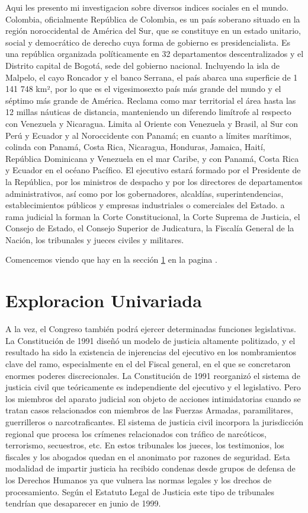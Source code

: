 \documentclass{article}
\begin{document}
Aqui les presento mi investigacion sobre diversos indices sociales en el mundo. Colombia, oficialmente República de Colombia, es un país soberano situado en la región noroccidental de América del Sur, que se constituye en un estado unitario, social y democrático de derecho cuya forma de gobierno es presidencialista. Es una república organizada políticamente en 32 departamentos descentralizados y el Distrito capital de Bogotá, sede del gobierno nacional. Incluyendo la isla de Malpelo, el cayo Roncador y el banco Serrana, el país abarca una superficie de 1 141 748 km², por lo que es el vigesimosexto país más grande del mundo y el séptimo más grande de América. Reclama como mar territorial el área hasta las 12 millas náuticas de distancia,  manteniendo un diferendo limítrofe al respecto con Venezuela y Nicaragua. Limita al Oriente con Venezuela y Brasil, al Sur con Perú y Ecuador y al Noroccidente con Panamá; en cuanto a límites marítimos, colinda con Panamá, Costa Rica, Nicaragua, Honduras, Jamaica, Haití, República Dominicana y Venezuela en el mar Caribe, y con Panamá, Costa Rica y Ecuador en el océano Pacífico. El ejecutivo estará formado por el Presidente de la República, por los ministros de despacho y por los directores de departamentos administrativos, así como por los gobernadores, alcaldías, superintendencias, establecimientos públicos y empresas industriales o comerciales del Estado. a rama judicial la forman la Corte Constitucional, la Corte Suprema de Justicia, el Consejo de Estado, el Consejo Superior de Judicatura, la Fiscalía General de la Nación, los tribunales y jueces civiles y militares.


Comencemos viendo que hay en la sección \ref{univariada} en la pagina \pageref{univariada}.


\section{Exploracion Univariada}\label{univariada}

 A la vez, el Congreso también podrá ejercer determinadas funciones legislativas. La Constitución de 1991 diseñó un modelo de justicia altamente politizado, y el resultado ha sido la existencia de injerencias del ejecutivo en los nombramientos clave del ramo, especialmente en el del Fiscal general, en el que se concretaron enormes poderes discrecionales. La Constitución de 1991 reorganizó el sistema de justicia civil que teóricamente es independiente del ejecutivo y el legislativo. Pero los miembros del aparato judicial son objeto de acciones intimidatorias cuando se tratan casos relacionados con miembros de las Fuerzas Armadas, paramilitares, guerrilleros o narcotraficantes. El sistema de justicia civil incorpora la jurisdicción regional que procesa los crímenes relacionados con tráfico de narcóticos, terrorismo, secuestros, etc. En estos tribunales los jueces, los testimonios, los fiscales y los abogados quedan en el anonimato por razones de seguridad. Esta modalidad de impartir justicia ha recibido condenas desde grupos de defensa de los Derechos Humanos ya que vulnera las normas legales y los drechos de procesamiento. Según el Estatuto Legal de Justicia este tipo de tribunales tendrían que desaparecer en junio de 1999.
\end{document}
